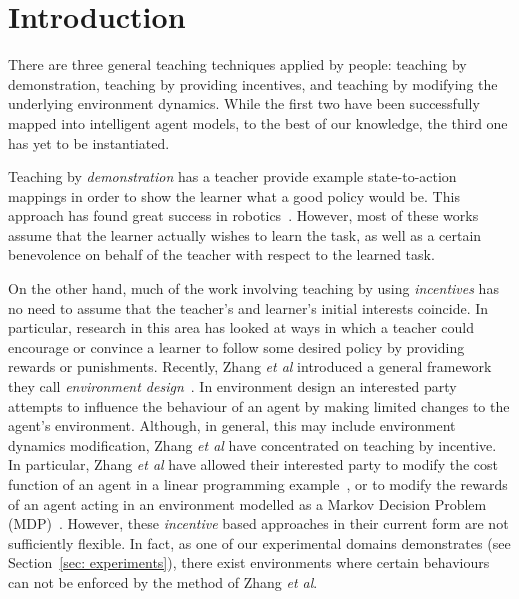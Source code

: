 

\section{Introduction}

There are three general teaching techniques applied by people:
teaching by demonstration, teaching by providing incentives, and
teaching by modifying the underlying environment dynamics.  While the
first two have been successfully mapped into intelligent agent models,
to the best of our knowledge, the third one has yet to be
instantiated.

Teaching by {\em demonstration} has a teacher provide example
state-to-action mappings in order to show the learner what a good
policy would be.  This approach has found great success in
robotics~\cite{argal_etal_2009}. However, most of these works assume
that the learner actually wishes to learn the task, as well as a
certain benevolence on behalf of the teacher with respect to the
learned task.

On the other hand, much of the work involving teaching by using {\em
  incentives} has no need to assume that the teacher's and learner's
initial interests coincide.  In particular, research in this area has
looked at ways in which a teacher could encourage or convince a
learner to follow some desired policy by providing rewards or
punishments.  Recently, Zhang \emph{et al} introduced a general
framework they call \emph{environment
  design}~\cite{Zhang09:General}. In environment design an interested
party attempts to influence the behaviour of an agent by making
limited changes to the agent's environment. Although, in general, this
may include environment dynamics modification, Zhang \emph{et al} have
concentrated on teaching by incentive. In particular, Zhang \emph{et
  al} have allowed their interested party to modify the cost function
of an agent in a linear programming example~\cite{Zhang09:General}, or
to modify the rewards of an agent acting in an environment modelled as
a Markov Decision Problem
(MDP)~\cite{zhang_parkes_2008,Zhang09:Policy}. However, these {\em
  incentive} based approaches in their current form are not
sufficiently flexible. In fact, as one of our experimental domains
demonstrates (see Section~\ref{sec: experiments}), there exist
environments where certain behaviours can not be enforced by the
method of Zhang \emph{et al}.

